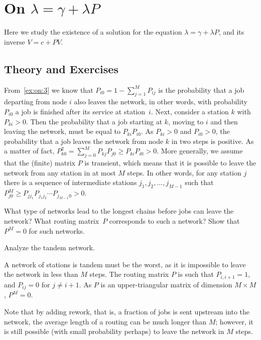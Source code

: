 \section{On $\lambda = \gamma + \lambda P$}
\label{sec:lambda-=-gamma}

Here we study the existence of a solution for the equation $\lambda = \gamma + \lambda P$, and its inverse $V = c + P V$. 

\subsection*{Theory and Exercises}



From~\cref{ex:on:3} we know that $P_{i0} = 1-\sum_{j=1}^M P_{ij}$ is the probability that a job departing from node $i$ also leaves the network, in other words, with probability $P_{i 0}$ a job is finished after its service at station~$i$.
Next, consider a station $k$ with $P_{ki} > 0$.
Then the probability that a job starting at $k$, moving to $i$ and then leaving the network, must be equal to $P_{ki}P_{i0}$.
As $P_{ki}>0$ and $P_{i0}>0$, the probability that a job leaves the network from node $k$ in two steps is positive.
As a matter of fact, $P^2_{k0} = \sum_{j=0}^M P_{kj}P_{j0} \geq P_{ki}P_{i0} > 0$.
More generally, we assume that the (finite) matrix $P$ is transient, which means that it is possible to leave the network from any station in at most $M$ steps.
In other words, for any station $j$ there is a sequence of intermediate stations $j_1, j_2, \ldots , j_{M-1}$ such that $P^{M}_{j0} \geq P_{j j_1}P_{j_1 j_2}\cdots P_{j_{M-1}0} > 0$.

\begin{extra}
  What type of networks lead to the longest chains before jobs can leave the network? What routing matrix~$P$ corresponds to such a network? Show that $P^M = 0$ for such networks.
\begin{hint}
Analyze the tandem network.    
\end{hint}
\begin{solution}
  A network of stations is tandem must be the worst, as it is impossible to leave the network in less than $M$ steps. The routing matrix $P$ is such that $P_{i, i+1} = 1$, and $P_{i j} = 0$ for $j\neq i+1$. As $P$ is an upper-triangular matrix of dimension $M\times M$, $P^M =0$. 

  Note that by adding rework, that is, a fraction of jobs is sent upstream into the network, the average length of a routing can be much longer than $M$; however, it is still possible (with small probability perhaps) to leave the network in $M$ steps.
\end{solution}
\end{extra}

